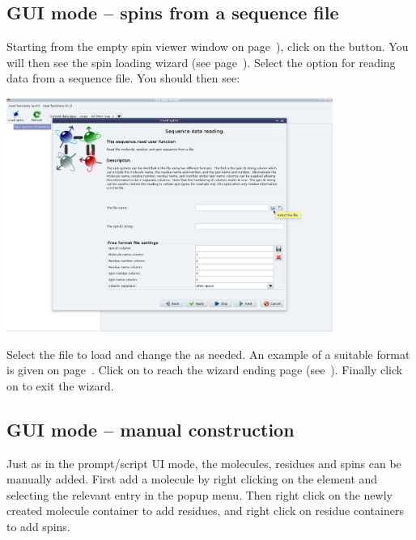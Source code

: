 
\subsection{GUI mode -- spins from a sequence file} \label{sect: GUI - sequence file}

Starting from the empty spin viewer window on page~\pageref{figure: spin viewer blank}), click on the  button.  You will then see the spin loading wizard (see page~\pageref{figure: spin viewer wizard start}).  Select the option for reading data from a sequence file.  You should then see:

\begin{minipage}[h]{\linewidth}
\centerline{\includegraphics[width=0.8\textwidth, bb=14 14 1415 1019]{graphics/screenshots/spin_viewer/wizard_sequence}}
\end{minipage}

Select the file to load and change the  as needed.  An example of a suitable format is given on page~\pageref{verb: noe.500.out}.  Click on  to reach the wizard ending page (see~\pageref{figure: spin viewer end}).  Finally click on  to exit the wizard.



\subsection{GUI mode -- manual construction} \label{sect: GUI - manual construction}

Just as in the prompt/script UI mode, the molecules, residues and spins can be manually added.  First add a molecule by right clicking on the  element and selecting the relevant entry in the popup menu.  Then right click on the newly created molecule container to add residues, and right click on residue containers to add spins.


